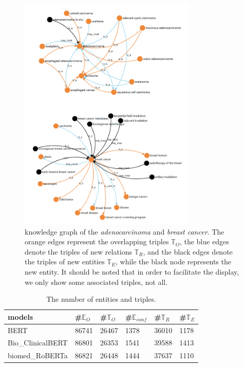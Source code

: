 \documentclass[sigconf]{acmart}
\begin{document}
\begin{figure}[t]
	\centering
	\includegraphics[width=0.75\textwidth]{figure2.png} %
	\caption{knowledge graph of the \textit{adenocarcinoma} and \textit{breast cancer}. The orange edges represent the overlapping triples  $\mathbb{T}_O$, the blue edges denote the triples of new relations $\mathbb{T}_R$, and the black edges denote the triples of new entities $\mathbb{T}_E$, while the black node represents the new entity. It should be noted that in order to facilitate the display, we only show some associated triples, not all.}
	\label{fig2}
\end{figure}

\begin{table}[h]
	\centering
	\begin{tabular}{llllll}
		\hline
		models            & \#$\mathbb{E}_{O}$ & \#$\mathbb{T}_{O}$ & \#$\mathbb{E}_{conf}$ & \#$\mathbb{T}_R$ & \#$\mathbb{T}_E$ \\ \hline
		BERT              & 86741        & 26467       & 1378           & 36010         & 1178                   \\
            Bio\_ClinicalBERT & 86801        & 26353       & 1541           & 39588         & 1413                   \\
            biomed\_RoBERTa   & 86821        & 26448       & 1444           & 37637         & 1110                   \\ \hline
	\end{tabular}
	
	\caption{The number of entities and triples.}
	\label{table3}
\end{table}
\end{document}
